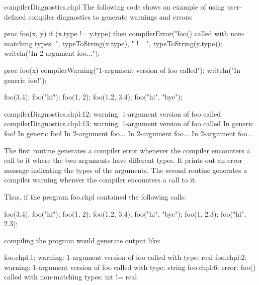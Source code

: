 \begin{chapelexample}{compilerDiagnostics.chpl}
The following code shows an example of using user-defined compiler
diagnostics to generate warnings and errors:
\begin{chapel}
proc foo(x, y) {
  if (x.type != y.type) then
    compilerError("foo() called with non-matching types: ", 
                  typeToString(x.type), " != ", typeToString(y.type));
  writeln("In 2-argument foo...");
}

proc foo(x) {
  compilerWarning("1-argument version of foo called");
  writeln("In generic foo!");
}
\end{chapel}
\begin{chapelpost}
foo(3.4);
foo("hi");
foo(1, 2);
foo(1.2, 3.4);
foo("hi", "bye");
\end{chapelpost}
\begin{chapeloutput}
compilerDiagnostics.chpl:12: warning: 1-argument version of foo called
compilerDiagnostics.chpl:13: warning: 1-argument version of foo called
In generic foo!
In generic foo!
In 2-argument foo...
In 2-argument foo...
In 2-argument foo...
\end{chapeloutput}

The first routine generates a compiler error whenever the compiler
encounters a call to it where the two arguments have different types.
It prints out an error message indicating the types of the arguments.
The second routine generates a compiler warning whenver the compiler
encounters a call to it.

Thus, if the program foo.chpl contained the following calls:

\begin{numberedchapel}
foo(3.4);
foo("hi");
foo(1, 2);
foo(1.2, 3.4);
foo("hi", "bye");
foo(1, 2.3);
foo("hi", 2.3);
\end{numberedchapel}

\noindent compiling the program would generate output like:

\begin{commandline}
foo.chpl:1: warning: 1-argument version of foo called with type: real
foo.chpl:2: warning: 1-argument version of foo called with type: string
foo.chpl:6: error: foo() called with non-matching types: int != real
\end{commandline}

\end{chapelexample}

